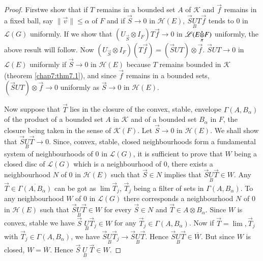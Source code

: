 \begin{proof}
 First\pageoriginale we show that if
$T$ remains in a bounded set $A$ of $\mathscr{K}$ and
$\overrightarrow{f}$ remains in a fixed ball, say $\parallel
\overrightarrow{v} \parallel \leq \alpha$ of $F$ and if
$\overrightarrow{S} \to 0$ in $\mathscr{H}(E)$, $\overrightarrow{S}
\underset{B}{U} T \overrightarrow{f}$ tends to $0$ in $\mathscr{L}(G)$
uniformly. If we show that $(U_{\overrightarrow{S}} \otimes I_F) T
\overrightarrow{f} \to 0$ in $\mathscr{L}(\fohprod{E}{F}{\pi})$
uniformly, the above result will 
follow. Now $(U_{\overrightarrow{S}} \otimes I_F) (T
\overrightarrow{f}) = (\overrightarrow{S} U T) \otimes
\overrightarrow{f}$. $\overrightarrow{S} U T \to 0$ in
$\mathscr{L}(E)$ uniformly if $\overrightarrow{S} \to 0$ in
$\mathscr{H}(E)$ because $T$ remains bounded in $\mathscr{K}$
(theorem \ref{chap7:thm7.1}), and since $\overrightarrow{f}$ remains
in a bounded sets,
$(\overrightarrow{S} U T) \otimes \overrightarrow{f} \to 0$ uniformly
as $\overrightarrow{S} \to 0$ in $\mathscr{H}(E)$. 

Now suppose that $\overrightarrow{T}$ lies in the closure of the
convex, stable, envelope $\Gamma (A, B_\alpha)$ of the product of a
bounded set $A$ in $\mathscr{K}$ and of a bounded set $B_\alpha$ in
$F$, the closure being taken in the sense of $\mathscr{K}(F)$. Let
$\overrightarrow{S} \to 0$ in $\mathscr{H}(E)$. We shall show that
$\overrightarrow{S} \underset{B}{U} \overrightarrow{T} \to 0$. Since,
convex, stable, closed neighbourhoods form a fundamental system of
neighbourhoods of $0$ in $\mathscr{L}(G)$, it is sufficient to prove
that $W$ being a closed disc of $\mathscr{L}(G)$ which is a
neighbourhood of $0$, there exists a neighbourhood $N$ of $0$ in
$\mathscr{H}(E)$ such that $\overrightarrow{S} \in N$ implies that
$\overrightarrow{S} \underset{B}{U} \overrightarrow{T} \in W$. Any
$\overrightarrow{T} \in \overline{\Gamma(A, B_\alpha)}$ can be got as
$\lim \overrightarrow{T}_j$, $\overrightarrow{T}_j$ being a filter of
sets in $\Gamma(A, B_\alpha)$. To any neighbourhood $W$ of $0$ in
$\mathscr{L}(G)$ there corresponds a neighbourhood $N$ of $0$ in
$\mathscr{H}(E)$ such that $\overrightarrow{S} \underset{B}{U}
\overrightarrow{T} \in W$ for every $\overrightarrow{S} \in N$ and
$\overrightarrow{T} \in A \otimes B_\alpha$. Since $W$ is convex,
stable we have $\overrightarrow{S}$ $\underset{B}{U}
\overrightarrow{T}_j \in W$ for any $\overrightarrow{T}_j \in
\Gamma(A, B_\alpha)$. Now if $\overrightarrow{T} = \lim,
\overrightarrow{T}_j$ with $\overrightarrow{T}_j \in \Gamma(A,
B_\alpha)$, we have $\overrightarrow{S} \underset{B}{U}
\overrightarrow{T}_j \to \overrightarrow{S} \underset{B}{U}
\overrightarrow{T}$. Hence $\overrightarrow{S} \underset{B}{U}
\overrightarrow{T} \in \overline{W}$. But since $W$ is closed, $W =
\overline{W}$. Hence $\overrightarrow{S}\; \underset{B}{U}\;
\overrightarrow{T} \in W$.


\end{proof}
